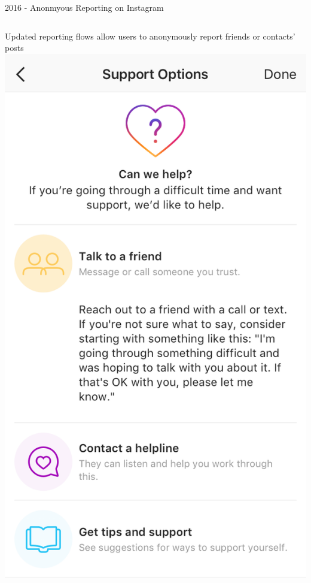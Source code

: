 \documentclass[nobackground,dvipsnames,table]{beamer}
\begin{document}
\begin{frame}{2016 - Anonmyous Reporting on Instagram}
    \begin{columns}
            \large
            Updated reporting flows allow users to anonymously report friends or contacts’ posts
            \includegraphics[width=\textwidth]{anonymous-reporting-instagram}
    \end{columns}
\end{frame}
\end{document}
